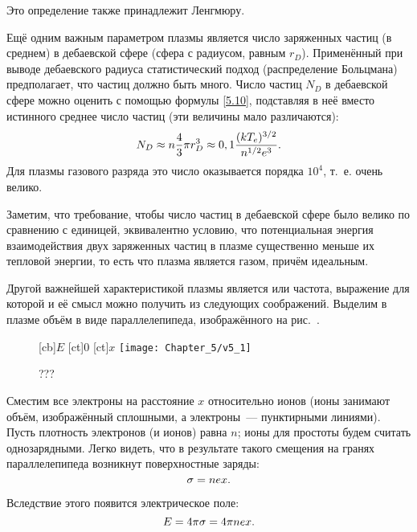 Это определение также принадлежит Ленгмюру.

Ещё одним важным параметром плазмы является число заряженных частиц (в среднем) в дебаевской сфере (сфера с радиусом,
равным $r_D$). Применённый при выводе дебаевского радиуса статистический подход (распределение Больцмана) предполагает,
что частиц должно быть много. Число частиц $N_D$ в дебаевской сфере можно оценить с помощью формулы \eqref{5.10},
подставляя в неё вместо истинного среднее число частиц (эти величины мало различаются):
\begin{equation}
	\eqmark{5.12}
	N_D\approx n\frac43\pi r_D^3\approx0,1\frac{(kT_e)^{3/2}}{n^{1/2}e^3}.
\end{equation}
Для плазмы газового разряда это число оказывается порядка $10^4$, т.~е. очень велико.

Заметим, что требование, чтобы число частиц в дебаевской сфере было велико по сравнению с единицей, эквивалентно
условию, что потенциальная энергия взаимодействия двух заряженных частиц в плазме существенно меньше их тепловой
энергии, то есть что плазма является газом, причём идеальным.

Другой важнейшей характеристикой плазмы является  или  частота, выражение для
которой и её смысл можно получить из следующих соображений. Выделим в плазме объём в виде параллелепипеда, изображённого на рис.~. 

\begin{figure}[h!]
	[cb]{$E$}
	[ct]{0}
	[ct]{$x$}
	\centering
	\texttt{[image: Chapter\_5/v5\_1]}
	\caption{???}
\end{figure}

Сместим все электроны на расстояние $x$ относительно ионов (ионы занимают объём, изображённый сплошными, а
электроны~--- пунктирными линиями).
Пусть плотность электронов (и ионов) равна $n$; ионы для простоты будем считать
однозарядными. Легко видеть, что в результате такого смещения на гранях параллелепипеда возникнут поверхностные заряды:
\begin{equation}
	\eqmark{5.13}
	\sigma=nex.
\end{equation}

Вследствие этого появится электрическое поле:
\begin{equation}
	\eqmark{5.14}
	E=4\pi\sigma=4\pi nex.
\end{equation}


